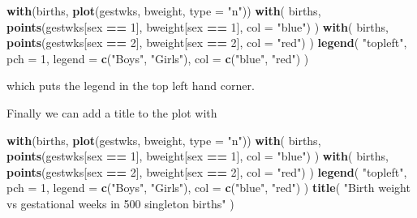 \documentclass[
]{book}
\newenvironment{Shaded}{\begin{snugshade}}{\end{snugshade}}
\newcommand{\AttributeTok}[1]{\textcolor[rgb]{0.13,0.29,0.53}{#1}}
\newcommand{\DecValTok}[1]{\textcolor[rgb]{0.00,0.00,0.81}{#1}}
\newcommand{\FunctionTok}[1]{\textcolor[rgb]{0.13,0.29,0.53}{\textbf{#1}}}
\newcommand{\NormalTok}[1]{#1}
\newcommand{\SpecialCharTok}[1]{\textcolor[rgb]{0.81,0.36,0.00}{\textbf{#1}}}
\newcommand{\StringTok}[1]{\textcolor[rgb]{0.31,0.60,0.02}{#1}}
\begin{document}
\begin{Shaded}
\begin{Highlighting}[]
\FunctionTok{with}\NormalTok{(births, }\FunctionTok{plot}\NormalTok{(gestwks, bweight, }\AttributeTok{type =} \StringTok{"n"}\NormalTok{))}
\FunctionTok{with}\NormalTok{(}
\NormalTok{  births, }
  \FunctionTok{points}\NormalTok{(gestwks[sex }\SpecialCharTok{==} \DecValTok{1}\NormalTok{], bweight[sex }\SpecialCharTok{==} \DecValTok{1}\NormalTok{], }\AttributeTok{col =} \StringTok{"blue"}\NormalTok{)}
\NormalTok{)}
\FunctionTok{with}\NormalTok{(}
\NormalTok{  births, }
  \FunctionTok{points}\NormalTok{(gestwks[sex }\SpecialCharTok{==} \DecValTok{2}\NormalTok{], bweight[sex }\SpecialCharTok{==} \DecValTok{2}\NormalTok{], }\AttributeTok{col =} \StringTok{"red"}\NormalTok{)}
\NormalTok{)}
\FunctionTok{legend}\NormalTok{(}
  \StringTok{"topleft"}\NormalTok{, }
  \AttributeTok{pch =} \DecValTok{1}\NormalTok{, }
  \AttributeTok{legend =} \FunctionTok{c}\NormalTok{(}\StringTok{"Boys"}\NormalTok{, }\StringTok{"Girls"}\NormalTok{), }
  \AttributeTok{col =} \FunctionTok{c}\NormalTok{(}\StringTok{"blue"}\NormalTok{, }\StringTok{"red"}\NormalTok{)}
\NormalTok{)}
\end{Highlighting}
\end{Shaded}

which puts the legend in the top left hand corner.

Finally we can add a title to the plot with

\begin{Shaded}
\begin{Highlighting}[]
\FunctionTok{with}\NormalTok{(births, }\FunctionTok{plot}\NormalTok{(gestwks, bweight, }\AttributeTok{type =} \StringTok{"n"}\NormalTok{))}
\FunctionTok{with}\NormalTok{(}
\NormalTok{  births, }
  \FunctionTok{points}\NormalTok{(gestwks[sex }\SpecialCharTok{==} \DecValTok{1}\NormalTok{], bweight[sex }\SpecialCharTok{==} \DecValTok{1}\NormalTok{], }\AttributeTok{col =} \StringTok{"blue"}\NormalTok{)}
\NormalTok{)}
\FunctionTok{with}\NormalTok{(}
\NormalTok{  births, }
  \FunctionTok{points}\NormalTok{(gestwks[sex }\SpecialCharTok{==} \DecValTok{2}\NormalTok{], bweight[sex }\SpecialCharTok{==} \DecValTok{2}\NormalTok{], }\AttributeTok{col =} \StringTok{"red"}\NormalTok{)}
\NormalTok{)}
\FunctionTok{legend}\NormalTok{(}
  \StringTok{"topleft"}\NormalTok{, }
  \AttributeTok{pch =} \DecValTok{1}\NormalTok{, }
  \AttributeTok{legend =} \FunctionTok{c}\NormalTok{(}\StringTok{"Boys"}\NormalTok{, }\StringTok{"Girls"}\NormalTok{), }
  \AttributeTok{col =} \FunctionTok{c}\NormalTok{(}\StringTok{"blue"}\NormalTok{, }\StringTok{"red"}\NormalTok{)}
\NormalTok{)}
\FunctionTok{title}\NormalTok{(}
  \StringTok{"Birth weight vs gestational weeks in 500 singleton births"}
\NormalTok{)}
\end{Highlighting}
\end{Shaded}
\end{document}
